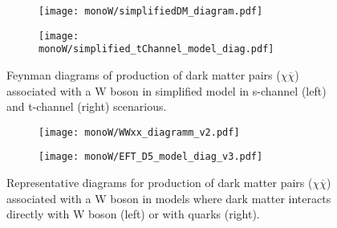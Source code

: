 







\begin{figure}[]

\centering
\begin{subfigure}{.5\textwidth}
  \centering
  \texttt{[image: monoW/simplifiedDM\_diagram.pdf]}
\end{subfigure}%
\begin{subfigure}{.5\textwidth}
  \centering
  \texttt{[image: monoW/simplified\_tChannel\_model\_diag.pdf]}
\end{subfigure}
  \caption{Feynman diagrams of production of dark matter pairs ($\chi\overline{\chi}$) associated with a W boson in simplified model 
	   in s-channel (left) and t-channel (right) scenarious.}
  \label{fig:feynMonoWSimple}
\end{figure}


\begin{figure}[]

\centering
\begin{subfigure}{.5\textwidth}
  \centering
  \texttt{[image: monoW/WWxx\_diagramm\_v2.pdf]}
\end{subfigure}%
\begin{subfigure}{.5\textwidth}
  \centering
  \texttt{[image: monoW/EFT\_D5\_model\_diag\_v3.pdf]}
\end{subfigure}
  \caption{Representative diagrams for production of dark matter pairs ($\chi\overline{\chi}$) associated with a W boson in models where
dark matter interacts directly with W boson (left) or with quarks (right).}
  \label{fig:feynMonoWEFT}
\end{figure}


